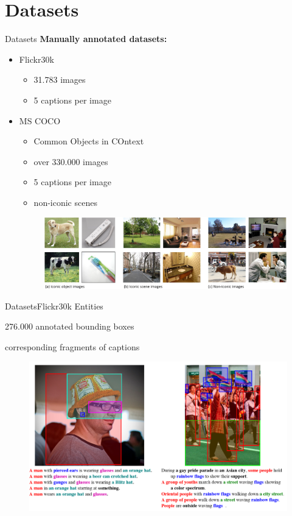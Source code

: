 \documentclass[16pt]{beamer}
\newenvironment{wideitemize}{\itemize\addtolength{\itemsep}{10pt}}{\enditemize}
\begin{document}
\section{Datasets}%
\begin{frame}{Datasets}
\textbf{Manually annotated datasets:}
\begin{itemize}
\item Flickr30k \cite{Young2014}
\begin{itemize}
    \item 31.783 images
    \item 5 captions per image
\end{itemize}
\item MS COCO \cite{Lin2014}
\begin{itemize}
\item Common Objects in COntext
\item over 330.000 images
\item 5 captions per image
\item non-iconic scenes
\end{itemize}
\begin{figure}[tb]
           \centering
           \includegraphics[width=\linewidth]{coco_images.png}
           \end{figure}
\end {itemize}

\end{frame}

\begin{frame}{Datasets}{Flickr30k Entities \cite{Plummer2015}}
\begin{wideitemize}
\item 276.000 annotated bounding boxes 
\item corresponding fragments of captions
\end{wideitemize}
\begin{figure}[tb]
           \centering
           \includegraphics[width=\linewidth]{entities.png}
           \end{figure}

\end{frame}
\end{document}
